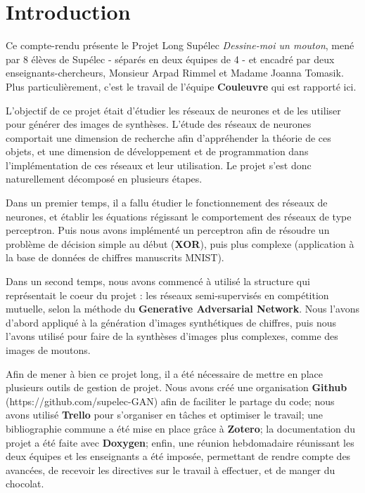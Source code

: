 \chapter*{Introduction}

Ce compte-rendu présente le Projet Long Supélec \textit{Dessine-moi un mouton}, mené par 8 élèves de Supélec - séparés en deux équipes de 4 - et encadré par deux enseignants-chercheurs, Monsieur Arpad Rimmel et Madame Joanna Tomasik. Plus particulièrement, c'est le travail de l'équipe \textbf{Couleuvre} qui est rapporté ici. 

L'objectif de ce projet était d'étudier les réseaux de neurones et de les utiliser pour générer des images de synthèses. L'étude des réseaux de neurones comportait une dimension de recherche afin d'appréhender la théorie de ces objets, et une dimension de développement et de programmation dans l'implémentation de ces réseaux et leur utilisation. Le projet s'est donc naturellement décomposé en plusieurs étapes.

Dans un premier temps, il a fallu étudier le fonctionnement des réseaux de neurones, et établir les équations régissant le comportement des réseaux de type perceptron. Puis nous avons implémenté un perceptron afin de résoudre un problème de décision simple au début (\textbf{XOR}), puis plus complexe (application à la base de données de chiffres manuscrits MNIST).

Dans un second temps, nous avons commencé à utilisé la structure qui représentait le coeur du projet : les réseaux semi-supervisés en compétition mutuelle, selon la méthode du \textbf{Generative Adversarial Network}. Nous l'avons d'abord appliqué à la génération d'images synthétiques de chiffres, puis nous l'avons utilisé pour faire de la synthèses d'images plus complexes, comme des images de moutons.

Afin de mener à bien ce projet long, il a été nécessaire de mettre en place plusieurs outils de gestion de projet. Nous avons créé une organisation \textbf{Github} (https://github.com/supelec-GAN) afin de faciliter le partage du code; nous avons utilisé \textbf{Trello} pour s'organiser en tâches et optimiser le travail; une bibliographie commune a été mise en place grâce à \textbf{Zotero}; la documentation du projet a été faite avec \textbf{Doxygen}; enfin, une réunion hebdomadaire réunissant les deux équipes et les enseignants a été imposée, permettant de rendre compte des avancées, de recevoir les directives sur le travail à effectuer, et de manger du chocolat. 

\newpage
